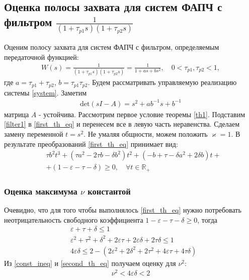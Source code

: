 \documentclass[a4paper,article,14pt]{extarticle}
\begin{document}
\subsection{Оценка полосы захвата для систем ФАПЧ с фильтром $\frac{1}{(1+\tau_{p1}s)(1+\tau_{p2}s)}$}
Оценим полосу захвата для систем ФАПЧ с фильтром, определяемым передаточной функцией:
 \begin{equation}\label{filter1}
 \begin{aligned}
W(s) = \frac{1}{(1+\tau_{p1}s)(1+\tau_{p2}s)} = \frac{1}{1+as + bs^2}, \quad 0<\tau_{p1},\tau_{p2} < 1,
 \end{aligned}
\end{equation}
где $a = \tau_{p1}+\tau_{p2}$, $b = \tau_{p1}\tau_{p2}$. Будем рассматривать управляемую реализацию системы \eqref{system}. Заметим
 \begin{equation}
 \begin{aligned}
\text{det}(sI-A) = s^2 + ab^{-1}s + b^{-1}
 \end{aligned}
\end{equation}
матрица $A$ - устойчива. Рассмотрим первое условие теоремы \ref{th1}. Подставим \eqref{filter1} в \eqref{first_th_eq} и перенесем все в левую часть неравенства. Сделаем замену переменной $t = s^2$. Не умаляя общности, можем положить $\varkappa = 1$. В результате преобразований \eqref{first_th_eq} принимает вид:
\begin{equation}\label{first_condition}
 \begin{aligned}
&\tau b^2t^3 + (\tau a^2-2 \tau b - \delta b^2)t^2 + (- b+\tau-\delta a^2 + 2\delta b)t +\\
&+ (1-\varepsilon-\tau-\delta) \geqslant 0, \quad \forall t \in \mathbb{R_+}
 \end{aligned}
\end{equation}

\subsubsection{Оценка максимума $\nu$ константой}
Очевидно, что для того чтобы выполнялось \eqref{first_th_eq} нужно потребовать неотрицательность свободного коэффициента $1 - \varepsilon - \tau - \delta \geqslant 0$, тогда
 \begin{align}
&\varepsilon+\tau+\delta \leqslant 1 \\
&\varepsilon^2 + \tau^2 + \delta^2 + 2\varepsilon\tau + 2\varepsilon\delta + 2\tau\delta \leqslant 1\\
&4\varepsilon\delta \leqslant 2 -(2\varepsilon^2 + 2\delta^2 + 2\tau^2 +4\varepsilon\tau + 4\tau\delta)\label{const_ineq}
 \end{align}
Из \eqref{const_ineq} и \eqref{second_th_eq} получаем оценку для $\nu^2$:
\begin{equation}
 \begin{aligned}
\nu^2 < 4\varepsilon\delta < 2
 \end{aligned}
\end{equation}
\end{document}
